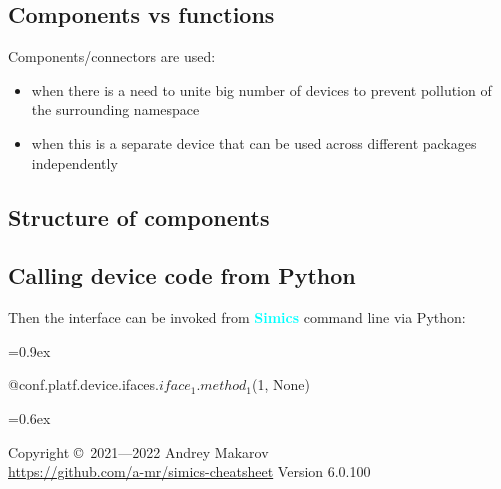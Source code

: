 \documentclass[8pt]{extarticle}
\newenvironment{code}[1][]{%
\begin{prebox}[#1]\obeylines%
\fontdimen2\font=0.9ex%
}{%
\end{prebox}%
\fontdimen2\font=0.6ex%
}
\newcommand{\Simics}{\textcolor{cyan}{\textbf{Simics}}}
\begin{document}
\begin{multicols*}{3}
\subsection{Components vs functions}

Components/connectors are used:
\begin{itemize}
    \item when there is a need to unite big number of devices
        to prevent pollution of the surrounding namespace
    \item when this is a separate device that can be used across
        different packages independently
\end{itemize}


\subsection{Structure of components}

\subsection{Calling device code from Python}

Then the interface can be invoked from \Simics{} command line via Python:
\begin{code}
    @conf.platf.device.ifaces.$iface_1$.$method_1$(1, None)
\end{code}

Copyright \copyright\ 2021—2022 Andrey Makarov \\
\href{https://github.com/a-mr/simics-cheatsheet}{https://github.com/a-mr/simics-cheatsheet}
Version 6.0.100

\end{multicols*}
\end{document}
